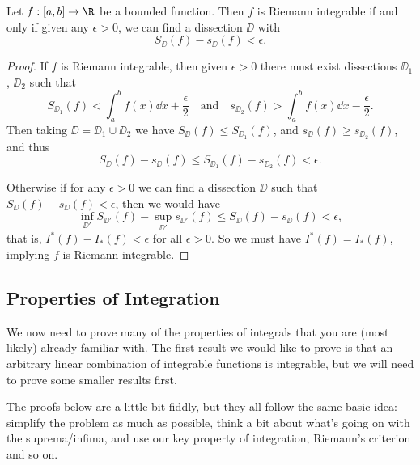 \begin{theorem}
	Let $f:[a, b] \rightarrow \R$ be a bounded function. Then $f$ is Riemann integrable if and only if given any $\epsilon>0$, we can find a dissection $\DD$ with
	$$
	S_\DD(f) - s_\DD(f) < \epsilon.
	$$
\end{theorem}
\begin{proof}
	If $f$ is Riemann integrable, then given $\epsilon > 0$ there must exist dissections $\DD_1$, $\DD_2$ such that
	$$
	S_{\DD_1}(f) < \int_a^b f(x) \dd x + \frac{\epsilon}{2} \quad \text{and} \quad s_{\DD_2}(f) > \int_a^b f(x) \dd x - \frac{\epsilon}{2}.
	$$
	Then taking $\DD = \DD_1 \cup \DD_2$ we have $S_{\DD}(f) \leq S_{\DD_1}(f)$, and $s_{\DD}(f) \geq s_{\DD_2}(f)$, and thus
	$$
	S_\DD(f) - s_\DD(f) \leq S_{\DD_1}(f) - s_{\DD_2}(f) < \epsilon.
	$$

	Otherwise if for any $\epsilon > 0$ we can find a dissection $\DD$ such that $S_{\DD}(f) - s_{\DD}(f) < \epsilon$, then we would have
	$$
	\inf_{\DD'} S_{\DD'}(f) - \sup_{\DD'} s_{\DD'}(f) \leq S_{\DD}(f) - s_{\DD}(f) < \epsilon,
	$$
	that is, $I^*(f) - I_*(f) < \epsilon$ for all $\epsilon > 0$. So we must have $I^*(f) = I_*(f)$, implying $f$ is Riemann integrable.
\end{proof}


\subsection{Properties of Integration}

We now need to prove many of the properties of integrals that you are (most likely) already familiar with. The first result we would like to prove is that an arbitrary linear combination of integrable functions is integrable, but we will need to prove some smaller results first.

The proofs below are a little bit fiddly, but they all follow the same basic idea: simplify the problem as much as possible, think a bit about what's going on with the suprema/infima, and use our key property of integration, Riemann's criterion and so on. 

